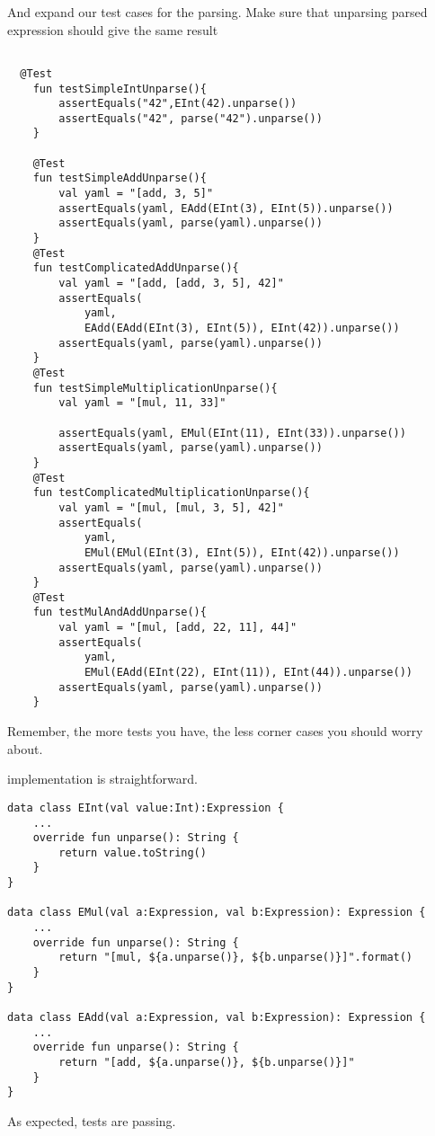 \documentclass[11pt]{article}
\begin{document}
And expand our test cases for the parsing.
Make sure that unparsing parsed expression should give the same result
\begin{verbatim}

  @Test
    fun testSimpleIntUnparse(){
        assertEquals("42",EInt(42).unparse())
        assertEquals("42", parse("42").unparse())
    }

    @Test
    fun testSimpleAddUnparse(){
        val yaml = "[add, 3, 5]"
        assertEquals(yaml, EAdd(EInt(3), EInt(5)).unparse())
        assertEquals(yaml, parse(yaml).unparse())
    }
    @Test
    fun testComplicatedAddUnparse(){
        val yaml = "[add, [add, 3, 5], 42]"
        assertEquals(
            yaml,
            EAdd(EAdd(EInt(3), EInt(5)), EInt(42)).unparse())
        assertEquals(yaml, parse(yaml).unparse())
    }
    @Test
    fun testSimpleMultiplicationUnparse(){
        val yaml = "[mul, 11, 33]"

        assertEquals(yaml, EMul(EInt(11), EInt(33)).unparse())
        assertEquals(yaml, parse(yaml).unparse())
    }
    @Test
    fun testComplicatedMultiplicationUnparse(){
        val yaml = "[mul, [mul, 3, 5], 42]"
        assertEquals(
            yaml,
            EMul(EMul(EInt(3), EInt(5)), EInt(42)).unparse())
        assertEquals(yaml, parse(yaml).unparse())
    }
    @Test
    fun testMulAndAddUnparse(){
        val yaml = "[mul, [add, 22, 11], 44]"
        assertEquals(
            yaml,
            EMul(EAdd(EInt(22), EInt(11)), EInt(44)).unparse())
        assertEquals(yaml, parse(yaml).unparse())
    }

\end{verbatim}

Remember, the more tests you have, the less corner cases you should worry about.

implementation is straightforward.

\begin{verbatim}
data class EInt(val value:Int):Expression {
    ...
    override fun unparse(): String {
        return value.toString()
    }
}

data class EMul(val a:Expression, val b:Expression): Expression {
    ...
    override fun unparse(): String {
        return "[mul, ${a.unparse()}, ${b.unparse()}]".format()
    }
}

data class EAdd(val a:Expression, val b:Expression): Expression {
    ...
    override fun unparse(): String {
        return "[add, ${a.unparse()}, ${b.unparse()}]"
    }
}
\end{verbatim}
As expected, tests are passing.
\end{document}
